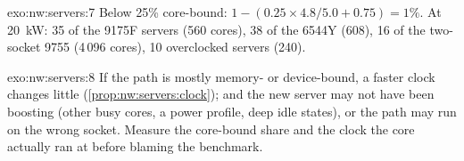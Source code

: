 \begin{solution}{exo:nw:servers:7}
Below 25\% core-bound: $1 - (0.25 \times 4.8/5.0 + 0.75) = 1\%$. At \qty{20}{\kilo\watt}: 35 of the 9175F servers (560 cores), 38 of the 6544Y
(608), 16 of the two-socket 9755 (4\,096 cores), 10 overclocked servers (240).
\end{solution}

\begin{solution}{exo:nw:servers:8}
If the path is mostly memory- or device-bound, a faster clock changes little (\cref{prop:nw:servers:clock}); and the new server may not have
been boosting (other busy cores, a power profile, deep idle states), or the path may run on the wrong socket. Measure the core-bound share and
the clock the core actually ran at before blaming the benchmark.
\end{solution}

